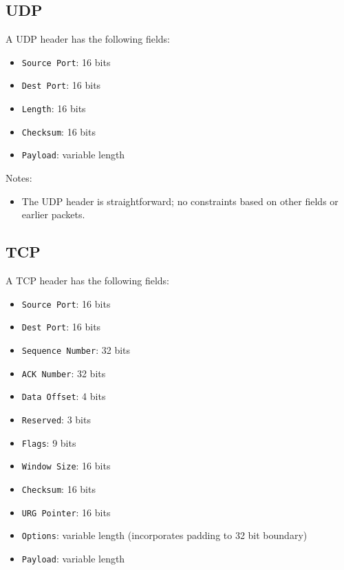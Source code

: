 \documentclass[10pt,a4paper]{article}
\begin{document}
\subsection{UDP}

A UDP header has the following fields:
\begin{itemize}
\item \texttt{Source Port}: 16 bits
\item \texttt{Dest Port}: 16 bits
\item \texttt{Length}: 16 bits
\item \texttt{Checksum}: 16 bits
\item \texttt{Payload}: variable length
\end{itemize}

Notes:
\begin{itemize}
\item The UDP header is straightforward; no constraints based on other fields or earlier packets.
\end{itemize}

\subsection{TCP}

A TCP header has the following fields:
\begin{itemize}
\item \texttt{Source Port}: 16 bits
\item \texttt{Dest Port}: 16 bits
\item \texttt{Sequence Number}: 32 bits
\item \texttt{ACK Number}: 32 bits
\item \texttt{Data Offset}: 4 bits
\item \texttt{Reserved}: 3 bits
\item \texttt{Flags}: 9 bits
\item \texttt{Window Size}: 16 bits
\item \texttt{Checksum}: 16 bits
\item \texttt{URG Pointer}: 16 bits
\item \texttt{Options}: variable length (incorporates padding to 32 bit boundary)
\item \texttt{Payload}: variable length
\end{itemize}
\end{document}
